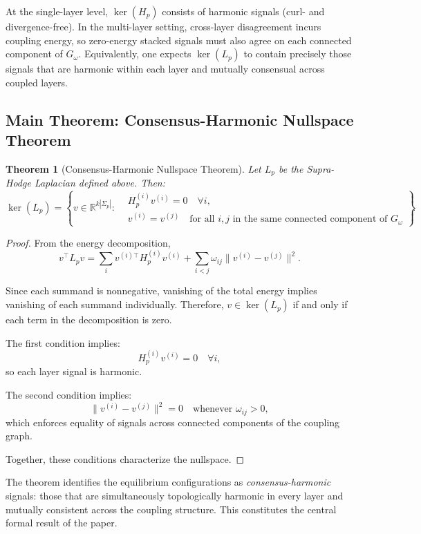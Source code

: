 \documentclass[11pt]{article}
\newtheorem{theorem}{Theorem}[section]
\theoremstyle{definition}
\theoremstyle{remark}
\newcommand{\Gom}{G_\omega}
\begin{document}
At the single-layer level, $\ker(H_p)$ consists of harmonic signals
(curl- and divergence-free). In the multi-layer setting, cross-layer
disagreement incurs coupling energy, so zero-energy stacked signals must also
agree on each connected component of $\Gom$. Equivalently, one expects
$\ker(L_p)$ to contain precisely those signals that are harmonic within each
layer and mutually consensual across coupled layers.

\subsection{Main Theorem: Consensus-Harmonic Nullspace Theorem}

\begin{theorem}[Consensus-Harmonic Nullspace Theorem]
\label{thm:main}
Let $L_p$ be the Supra-Hodge Laplacian defined above. Then:
\[
\ker(L_p)
=
\left\{
v \in \mathbb{R}^{k|\Sigma_p|} :
\begin{aligned}
& H_p^{(i)} v^{(i)} = 0 \quad \forall i, \\
& v^{(i)} = v^{(j)} \quad \text{for all } i,j \text{ in the same connected component of } G_\omega
\end{aligned}
\right\}.
\]
\end{theorem}

\begin{proof}
From the energy decomposition,
\[
v^\top L_p v
=
\sum_i v^{(i)\top} H_p^{(i)} v^{(i)}
+
\sum_{i<j} \omega_{ij} \|v^{(i)} - v^{(j)}\|^2.
\]

Since each summand is nonnegative, vanishing of the total energy implies vanishing of each summand individually. Therefore, $v \in \ker(L_p)$ if and only if each term in the decomposition is zero.

The first condition implies:
\[
H_p^{(i)} v^{(i)} = 0 \quad \forall i,
\]
so each layer signal is harmonic.

The second condition implies:
\[
\|v^{(i)} - v^{(j)}\|^2 = 0 \quad \text{whenever } \omega_{ij} > 0,
\]
which enforces equality of signals across connected components of the coupling graph.

Together, these conditions characterize the nullspace.
\end{proof}

The theorem identifies the equilibrium configurations as \emph{consensus-harmonic} signals: those that are simultaneously topologically harmonic in every layer and mutually consistent across the coupling structure. This constitutes the central formal result of the paper.
\end{document}
